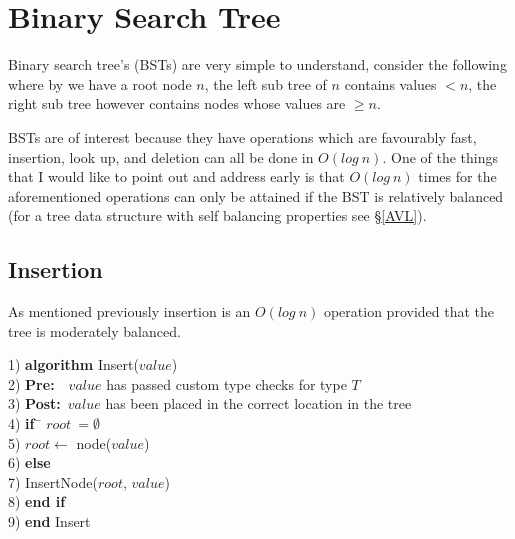 \chapter{Binary Search Tree}
Binary search tree's (BSTs) are very simple to understand, consider the following where by we have a root node $n$, the left sub tree of $n$ contains values $< n$, the right sub tree however contains nodes whose values are $\geq n$.

BSTs are of interest because they have operations which are favourably fast, insertion, look up, and deletion can all be done in $O(log~n)$. One of the things that I would like to point out and address early is that $O(log~n)$ times for the aforementioned operations can only be attained if the BST is relatively balanced (for a tree data structure with self balancing properties see \S\ref{AVL}). 

\section{Insertion}
As mentioned previously insertion is an $O(log~n)$ operation provided that the tree is moderately balanced.

\begin{tabbing}
1)  \textbf{alg}\= \textbf{orithm} Insert($value$) \\
2)  \> \textbf{Pre:}~~$value$ has passed custom type checks for type $T$ \\
3)  \> \textbf{Post:}~$value$ has been placed in the correct location in the tree \\
4)  \> \textbf{if}~\= $root~= \emptyset$ \\
5)  \> \> $root \leftarrow$ node($value$) \\
6)  \> \textbf{else} \\
7)  \> \> InsertNode($root$, $value$) \\
8)  \> \textbf{end if} \\
9)  \textbf{end} Insert \\
\end{tabbing}


